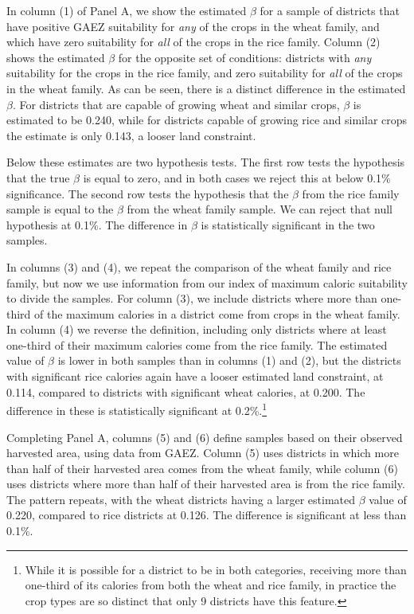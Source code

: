 \documentclass[11pt]{article}
\begin{document}
In column (1) of Panel A, we show the estimated $\beta$ for a sample of districts that have positive GAEZ suitability for \textit{any} of the crops in the wheat family, and which have zero suitability for \textit{all} of the crops in the rice family. Column (2) shows the estimated $\beta$ for the opposite set of conditions: districts with \textit{any} suitability for the crops in the rice family, and zero suitability for \textit{all} of the crops in the wheat family. As can be seen, there is a distinct difference in the estimated $\beta$. For districts that are capable of growing wheat and similar crops, $\beta$ is estimated to be 0.240, while for districts capable of growing rice and similar crops the estimate is only 0.143, a looser land constraint.

Below these estimates are two hypothesis tests. The first row tests the hypothesis that the true $\beta$ is equal to zero, and in both cases we reject this at below 0.1\% significance. The second row tests the hypothesis that the $\beta$ from the rice family sample is equal to the $\beta$ from the wheat family sample. We can reject that null hypothesis at 0.1\%. The difference in $\beta$ is statistically significant in the two samples.

In columns (3) and (4), we repeat the comparison of the wheat family and rice family, but now we use information from our index of maximum caloric suitability to divide the samples. For column (3), we include districts where more than one-third of the maximum calories in a district come from crops in the wheat family. In column (4) we reverse the definition, including only districts where at least one-third of their maximum calories come from the rice family. The estimated value of $\beta$ is lower in both samples than in columns (1) and (2), but the districts with significant rice calories again have a looser estimated land constraint, at 0.114, compared to districts with significant wheat calories, at 0.200. The difference in these is statistically significant at 0.2\%.\footnote{While it is possible for a district to be in both categories, receiving more than one-third of its calories from both the wheat and rice family, in practice the crop types are so distinct that only 9 districts have this feature.}

Completing Panel A, columns (5) and (6) define samples based on their observed harvested area, using data from GAEZ. Column (5) uses districts in which more than half of their harvested area comes from the wheat family, while column (6) uses districts where more than half of their harvested area is from the rice family. The pattern repeats, with the wheat districts having a larger estimated $\beta$ value of 0.220, compared to rice districts at 0.126. The difference is significant at less than 0.1\%.
\end{document}
